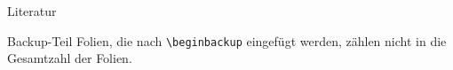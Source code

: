 \documentclass[en]{sdqbeamer}
\begin{document}
\begin{frame}
	
\end{frame}

\appendix
\beginbackup

\begin{frame}{Literatur}
	\begin{exampleblock}{Backup-Teil}
		Folien, die nach \texttt{\textbackslash beginbackup} eingefügt werden, zählen nicht in die Gesamtzahl der Folien.
	\end{exampleblock}
	
	\printbibliography
\end{frame}
\end{document}
